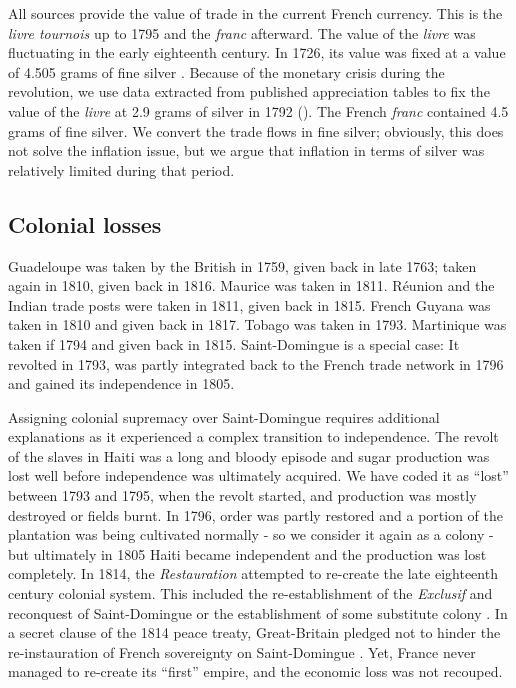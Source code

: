 \documentclass[12pt,a4paper,notitlepage,english]{article}
\begin{document}
\begin{appendix}
All sources provide the value of trade in the current French currency. This is the \textit{livre tournois} up to 1795 and the \textit{franc} afterward. The value of the \textit{livre} was fluctuating in the early eighteenth century. In 1726, its value was fixed at a value of 4.505 grams of fine silver \citep{Dewailly1857}. Because of the monetary crisis during the revolution, we use data extracted from published appreciation tables to fix the value of the \textit{livre} at 2.9 grams of silver in 1792 (\cite{Hoffman2000}). The French \textit{franc} contained 4.5 grams of fine silver. We convert the trade flows in fine silver; obviously, this does not solve the inflation issue, but we argue that inflation in terms of silver was relatively limited during that period. 

\subsection{Colonial losses }\label{app:appendix_colonial_losse}

Guadeloupe was taken by the British in 1759, given back in late 1763; taken again in 1810, given back in 1816.
Maurice was taken in 1811.
Réunion and the Indian trade posts were taken in 1811, given back in 1815.
French Guyana was taken in 1810 and given back in 1817.
Tobago was taken in 1793.
Martinique was taken if 1794 and given back in 1815.
Saint-Domingue is a special case: It revolted in 1793, was partly integrated back to the French trade network in 1796 and gained its independence in 1805. 

Assigning colonial supremacy over Saint-Domingue requires additional explanations as it experienced a complex transition to independence. 
The revolt of the slaves in Haiti was a long and bloody episode and sugar production was lost well before independence was ultimately acquired.
We have coded it as ``lost'' between 1793 and 1795, when the revolt started, and production was mostly destroyed or fields burnt.
In 1796, order was partly restored and a portion of the plantation was being cultivated normally - so we consider it again as a colony - but ultimately in 1805 Haiti became independent and the production was lost completely.
In 1814, the \textit{Restauration} attempted to re-create the late eighteenth century colonial system.
This included the re-establishment of the \textit{Exclusif} and reconquest of Saint-Domingue or the establishment of some substitute colony \citep{Todd2011}.
In a secret clause of the 1814 peace treaty, Great-Britain pledged not to hinder the re-instauration of French sovereignty on Saint-Domingue \citep{Schefer1907}.
Yet, France never managed to re-create its ``first'' empire, and the economic loss was not recouped.


\end{appendix}
\end{document}
